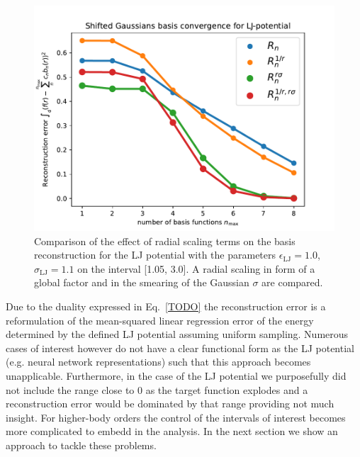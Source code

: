 \begin{figure}
    \includegraphics[width=\textwidth]{fig/convergence_results-grid500.pdf}
    \caption{Comparison of the effect of radial scaling terms on the basis reconstruction for the LJ potential with the parameters $\epsilon_\textrm{LJ}=1.0$, $\sigma_\textrm{LJ}=1.1$ on the interval [1.05, 3.0]. A radial scaling in form of a global factor and in the smearing of the Gaussian $\sigma$ are compared.}
    \label{fig:radial-scaling}
\end{figure}
Due to the duality expressed in Eq.~\ref{TODO} the reconstruction error is a reformulation of the mean-squared linear regression error of the energy determined by the defined LJ potential assuming uniform sampling.
Numerous cases of interest however do not have a clear functional form as the LJ potential (e.g. neural network representations) such that this approach becomes unapplicable.
Furthermore, in the case of the LJ potential we purposefully did not include the range close to $0$ as the target function explodes and a reconstruction error would be dominated by that range providing not much insight.
For higher-body orders the control of the intervals of interest becomes more complicated to embedd in the analysis.
In the next section we show an approach to tackle these problems.


